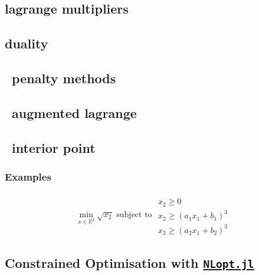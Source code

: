 \documentclass[11pt]{article}
\begin{document}
    \subsection{lagrange multipliers}\label{lagrange-multipliers}

    \subsection{duality}\label{duality}

    \subsection{~penalty methods}\label{penalty-methods}

    \subsection{~augmented lagrange}\label{augmented-lagrange}

    \subsection{~interior point}\label{interior-point}

    \subsubsection{Examples}\label{examples}

\[ 
\min_{x \in \mathbb{R}^2} \sqrt{x_2} \text{ subject to }\begin{array}{c} \\
 x_2 \geq 0 \\
 x_2 \geq (a_1 x_1 + b_1)^3 \\
x_2 \geq (a_2 x_1 + b_2)^3 
\end{array}
\]

    \subsection{\texorpdfstring{Constrained Optimisation with
\href{https://github.com/JuliaOpt/NLopt.jl}{\texttt{NLopt.jl}}}{Constrained Optimisation with NLopt.jl}}\label{constrained-optimisation-with-nlopt.jl}
\end{document}
